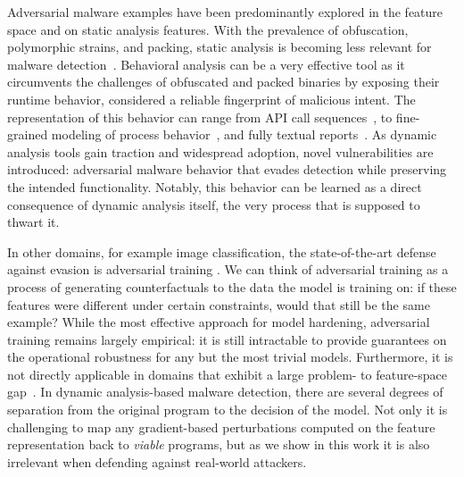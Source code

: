 Adversarial malware examples have been predominantly explored in the feature space and on static analysis features.
With the prevalence of obfuscation, polymorphic strains, and packing, static analysis is becoming less relevant for malware detection~\cite{aghakhani2020malware}.
Behavioral analysis can be a very effective tool as it circumvents the challenges of obfuscated and packed binaries by exposing their runtime behavior, considered a reliable fingerprint of malicious intent.
The representation of this behavior can range from API call sequences~\cite{tian2010differentiating, rosenberg2018generic}, to fine-grained modeling of process behavior~\cite{continella2016shieldfs}, and fully textual reports~\cite{mandlik2022jsongrinder}.
As dynamic analysis tools gain traction and widespread adoption, novel vulnerabilities are introduced: adversarial malware behavior that evades detection while preserving the intended functionality.
Notably, this behavior can be learned as a direct consequence of dynamic analysis itself, the very process that is supposed to thwart it.

In other domains, for example image classification, the state-of-the-art defense against evasion is adversarial training \cite{madry2017towards, tramer2020adaptive}.
We can think of adversarial training as a process of generating counterfactuals to the data the model is training on: if these features were different under certain constraints, would that still be the same example?
While the most effective approach for model hardening, adversarial training remains largely empirical: it is still intractable to provide guarantees on the operational robustness for any but the most trivial models.
Furthermore, it is not directly applicable in domains that exhibit a large problem- to feature-space gap~\cite{pierazzi2020intriguing}.
In dynamic analysis-based malware detection, there are several degrees of separation from the original program to the decision of the model.
Not only it is challenging to map any gradient-based perturbations computed on the feature representation back to \textit{viable} programs, but as we show in this work it is also irrelevant when defending against real-world attackers.

